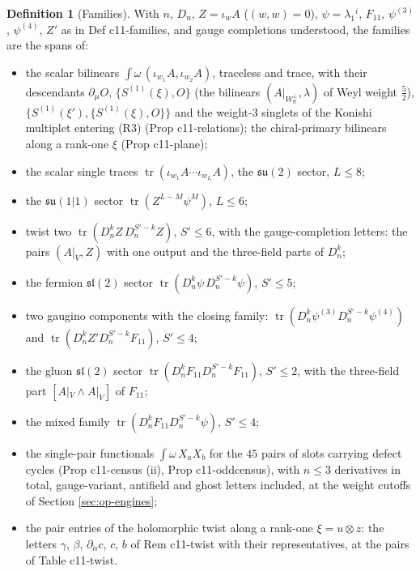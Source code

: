 \documentclass[11pt]{article}
\numberwithin{equation}{section}
\theoremstyle{plain}
\theoremstyle{definition}
\newtheorem{definition}[theorem]{Definition}
\newcommand{\Ap}{A|_{W_{\mathbb R}^\perp}}
\newcommand{\AV}{A|_V}
\begin{document}
\begin{definition}[Families]
\label{def:op-families}
With $n$, $D_n$, $Z=\iota_wA$ ($(w,w)=0$), $\psi=\lambda_1{}^i$, $F_{11}$, $\psi^{(3)}$, $\psi^{(4)}$, $Z'$ as in Def c11-families, and gauge completions understood, the families are the spans of:
\begin{itemize}
\item[F0] the scalar bilinears $\int\omega\,(\iota_{w_1}A,\iota_{w_2}A)$, traceless and trace, with their descendants $\partial_\mu O$, $\{S^{(1)}(\xi),O\}$ (the bilinears $(\Ap,\lambda)$ of Weyl weight $\tfrac52$), $\{S^{(1)}(\xi'),\{S^{(1)}(\xi),O\}\}$ and the weight-$3$ singlets of the Konishi multiplet entering (R3) (Prop c11-relations); the chiral-primary bilinears along a rank-one $\xi$ (Prop c11-plane);
\item[F1] the scalar single traces $\operatorname{tr}(\iota_{w_1}A\cdots\iota_{w_L}A)$, the $\mathfrak{su}(2)$ sector, $L\le8$;
\item[F2] the $\mathfrak{su}(1|1)$ sector $\operatorname{tr}(Z^{L-M}\psi^M)$, $L\le6$;
\item[F3] twist two $\operatorname{tr}(D_n^kZ\,D_n^{S'-k}Z)$, $S'\le6$, with the gauge-completion letters: the pairs $(\AV,Z)$ with one output and the three-field parts of $D_n^k$;
\item[F4] the fermion $\mathfrak{sl}(2)$ sector $\operatorname{tr}(D_n^k\psi\,D_n^{S'-k}\psi)$, $S'\le5$;
\item[F5] two gaugino components with the closing family: $\operatorname{tr}(D_n^k\psi^{(3)}D_n^{S'-k}\psi^{(4)})$ and $\operatorname{tr}(D_n^kZ'D_n^{S'-k}F_{11})$, $S'\le4$;
\item[F6] the gluon $\mathfrak{sl}(2)$ sector $\operatorname{tr}(D_n^kF_{11}D_n^{S'-k}F_{11})$, $S'\le2$, with the three-field part $[A|_V\wedge A|_V]$ of $F_{11}$;
\item[F7] the mixed family $\operatorname{tr}(D_n^kF_{11}D_n^{S'-k}\psi)$, $S'\le4$;
\item[F8] the single-pair functionals $\int\omega\,X_aX_b$ for the $45$ pairs of slots carrying defect cycles (Prop c11-census (ii), Prop c11-oddcensus), with $n\le3$ derivatives in total, gauge-variant, antifield and ghost letters included, at the weight cutoffs of Section \ref{sec:op-engines};
\item[F9] the pair entries of the holomorphic twist along a rank-one $\xi=u\otimes z$: the letters $\gamma$, $\beta$, $\partial_{\dot\alpha}c$, $c$, $b$ of Rem c11-twist with their representatives, at the pairs of Table c11-twist.
\end{itemize}
\end{definition}
\end{document}
